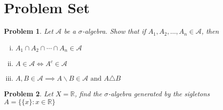 \documentclass{article}
\newtheorem{problem}{Problem}
\begin{document}
\section*{Problem Set}

\begin{problem}
Let $\mathscr{A}$ be a $\sigma$-algebra. Show that if $A_1, A_2, \dots, A_n \in \mathscr{A}$, then 
\begin{enumerate}[i)]
	\item $A_1 \cap A_2 \cap \cdots \cap A_n \in \mathscr{A}$
	\item $A \in \mathscr{A} \iff A^c \in \mathscr{A}$
	\item $A,B \in \mathscr{A} \implies A\backslash B \in \mathscr{A} \text{ and } A \triangle B$

    \end{enumerate}
\end{problem}

\vspace{1em} %
\begin{problem}
	Let $X = \mathbb{R}$, find the $\sigma$-algebra generated by the sigletons $A = \{\{x\}:x\in \mathbb{R}\}$
\end{problem}

\vspace{1em}
\end{document}
